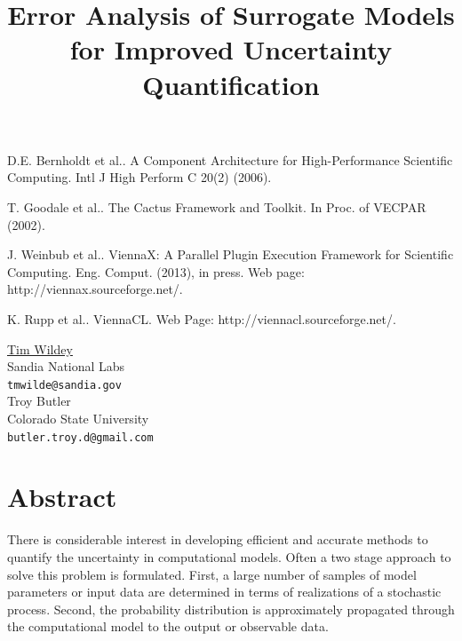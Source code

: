 \documentclass[article, A4, 11pt]{llncs}%
\begin{document}

\begin{thebibliography}{10}
{\sc D.E. Bernholdt et al.}. {A Component Architecture for High-Performance Scientific Computing}. Intl J High Perform C 20(2) (2006).

{\sc T. Goodale et al.}. {The Cactus Framework and Toolkit}. In Proc. of VECPAR (2002).

{\sc J. Weinbub et al.}. {ViennaX: A Parallel Plugin Execution Framework for Scientific Computing}. Eng. Comput. (2013), in press. Web page: http://viennax.sourceforge.net/.

{\sc K. Rupp et al.}. {ViennaCL}. Web Page: http://viennacl.sourceforge.net/.
\end{thebibliography} %

\title{Error Analysis of Surrogate Models for Improved Uncertainty Quantification}
 \author{} \institute{}
\maketitle
\vspace{-3mm}
\begin{center}
{\large \underline{Tim Wildey}}\\
Sandia National Labs\\
{\tt tmwilde@sandia.gov}
\\ \vspace{4mm}
{\large Troy Butler}\\
Colorado State University\\
{\tt butler.troy.d@gmail.com}
\end{center}

\section*{Abstract}
There is considerable interest in developing efficient and accurate methods to quantify the uncertainty in computational models.  Often a two stage approach to solve this problem is formulated. First, a large number of samples of model parameters or input data are determined in terms of realizations of a stochastic process. Second, the probability distribution is approximately propagated through the computational model to the output or observable data. 
\end{document}
